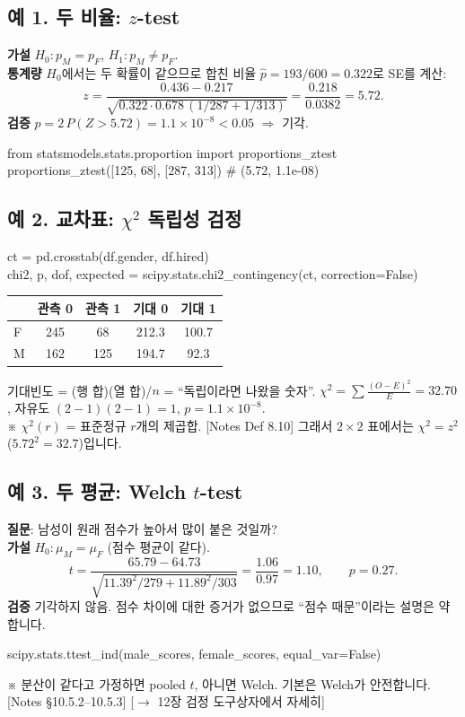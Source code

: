 \documentclass[11pt,a4paper]{article}
\newcommand{\nref}[1]{{\footnotesize\textsf{\color{blue!55!black}[Notes #1]}}}
\newcommand{\aside}[1]{{\footnotesize\color{black!65}#1}}
\newcommand{\fwd}[1]{{\footnotesize\textsf{\color{green!40!black}[$\to$ #1에서 자세히]}}}
\begin{document}
\subsection{예 1. 두 비율: $z$-test}
\textbf{가설} $H_0:p_M=p_F$, $H_1:p_M\ne p_F$.\\
\textbf{통계량} $H_0$에서는 두 확률이 같으므로 합친 비율 $\hat p=193/600=0.322$로 SE를 계산:
\[
z=\frac{0.436-0.217}{\sqrt{0.322\cdot0.678\,(1/287+1/313)}}=\frac{0.218}{0.0382}=5.72.
\]
\textbf{검증} $p=2\,P(Z>5.72)=1.1\times10^{-8}<0.05$ $\Rightarrow$ 기각.
\begin{codebox}
from statsmodels.stats.proportion import proportions\_ztest\\
proportions\_ztest([125, 68], [287, 313]) \hfill \# (5.72, 1.1e-08)
\end{codebox}

\subsection{예 2. 교차표: $\chi^2$ 독립성 검정}
\begin{codebox}
ct = pd.crosstab(df.gender, df.hired)\\
chi2, p, dof, expected = scipy.stats.chi2\_contingency(ct, correction=False)
\end{codebox}
\begin{center}
\begin{tabular}{@{}l c c c c@{}}
\toprule
 & 관측 0 & 관측 1 & 기대 0 & 기대 1 \\
\midrule
F & 245 & 68 & 212.3 & 100.7 \\
M & 162 & 125 & 194.7 & 92.3 \\
\bottomrule
\end{tabular}
\end{center}
기대빈도 = (행 합)(열 합)/$n$ = ``독립이라면 나왔을 숫자''. $\chi^2=\sum\frac{(O-E)^2}{E}=32.70$, 자유도 $(2-1)(2-1)=1$, $p=1.1\times10^{-8}$.\\
\aside{※ $\chi^2(r)$ = 표준정규 $r$개의 제곱합. \nref{Def 8.10} 그래서 $2\times2$ 표에서는 $\chi^2=z^2$ ($5.72^2=32.7$)입니다.}

\subsection{예 3. 두 평균: Welch $t$-test}
\textbf{질문}: 남성이 원래 점수가 높아서 많이 붙은 것일까?\\
\textbf{가설} $H_0:\mu_M=\mu_F$ (점수 평균이 같다).
\[
t=\frac{65.79-64.73}{\sqrt{11.39^2/279+11.89^2/303}}=\frac{1.06}{0.97}=1.10,\qquad p=0.27.
\]
\textbf{검증} 기각하지 않음. 점수 차이에 대한 증거가 없으므로 ``점수 때문''이라는 설명은 약합니다.
\begin{codebox}
scipy.stats.ttest\_ind(male\_scores, female\_scores, equal\_var=False)
\end{codebox}
\aside{※ 분산이 같다고 가정하면 pooled $t$, 아니면 Welch. 기본은 Welch가 안전합니다. \nref{§10.5.2–10.5.3}} \fwd{12장 검정 도구상자}
\end{document}
